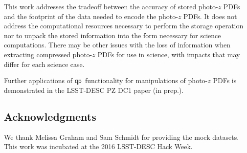 \documentclass[\docopts]{\docclass}
\newcommand{\qp}{\texttt{qp}}
\newcommand{\pz}{photo-$z$ PDF}
\begin{document}
This work addresses the tradeoff between the accuracy of stored \pz s and the 
footprint of the data needed to encode the \pz s.  It does not address the 
computational resources necessary to perform the storage operation nor to 
unpack the stored information into the form necessary for science computations. 
 There may be other issues with the loss of information when extracting 
compressed \pz s for use in science, with impacts that may differ for each 
science case.

Further applications of \qp\ functionality for manipulations of \pz s is 
demonstrated in the LSST-DESC PZ DC1 paper (in prep.).

\subsection*{Acknowledgments}


We thank Melissa Graham and Sam Schmidt for providing the mock datasets.  This 
work was incubated at the 2016 LSST-DESC Hack Week.







\end{document}
